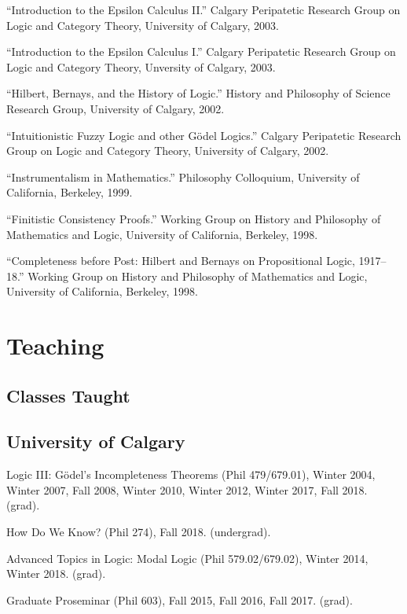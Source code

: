 \documentclass[11pt]{article}
\def\printdate#1{\xprintdate#1-}
\def\xprintdate#1-#2-#3-{#1}
\begin{document}
\ind ``Introduction to the Epsilon Calculus II.'' Calgary Peripatetic Research Group on Logic and Category Theory, University of Calgary, \printdate{2003-11-12}.

\ind ``Introduction to the Epsilon Calculus I.'' Calgary Peripatetic Research Group on Logic and Category Theory, Unversity of Calgary, \printdate{2003-10-29}.

\ind ``Hilbert, Bernays, and the History of Logic.'' History and Philosophy of Science Research Group, University of Calgary, \printdate{2002-04-04}.

\ind ``Intuitionistic Fuzzy Logic and other Gödel Logics.'' Calgary Peripatetic Research Group on Logic and Category Theory, University of Calgary, \printdate{2002-03-25}.

\ind ``Instrumentalism in Mathematics.'' Philosophy Colloquium, University of California, Berkeley, \printdate{1999-00-00}.

\ind ``Finitistic Consistency Proofs.'' Working Group on History and Philosophy of Mathematics and Logic, University of California, Berkeley, \printdate{1998-12-08}.

\ind ``Completeness before Post: Hilbert and Bernays on Propositional Logic,
1917--18.'' Working Group on History and Philosophy of Mathematics and Logic, University of California, Berkeley, \printdate{1998-11-04}.


\section{Teaching}

\subsection{Classes Taught}

\subsection{University of Calgary}
\ind Logic III: Gödel's Incompleteness Theorems (Phil 479/679.01), Winter 2004, Winter 2007, Fall 2008, Winter 2010, Winter 2012, Winter
2017, Fall 2018. (grad).

\ind How Do We Know? (Phil 274), Fall 2018. (undergrad).

\ind Advanced Topics in Logic: Modal Logic (Phil 579.02/679.02), Winter 2014, Winter 2018. (grad).

\ind Graduate Proseminar (Phil 603), Fall 2015, Fall 2016, Fall 2017. (grad).
\end{document}
